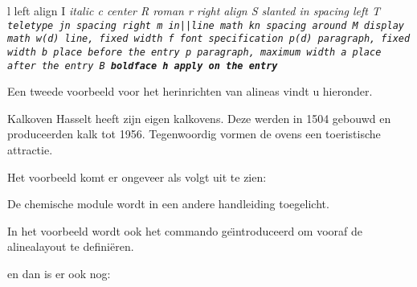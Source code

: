 \starttabel[|lT|l|lT|l|]
\NC l                 \NC left align
\NC I                 \NC \it italic
\NC \FR
\NC c                 \NC center
\NC R                 \NC \sl roman
\NC \MR
\NC r                 \NC right align
\NC S                 \NC \sl slanted
\NC \MR
\NC i\sl n            \NC spacing left
\NC T                 \NC \tt teletype
\NC \MR
\NC j\sl n            \NC spacing right
\NC m                 \NC in||line math
\NC \MR
\NC k\sl n            \NC spacing around
\NC M                 \NC display  math
\NC \MR
\NC w({\sl d})         line,   fixed width
\NC f    \NC font specification
\NC \MR
\NC p({\sl d})        \NC paragraph, fixed width
\NC b         \NC place  before the entry
\NC \MR
\NC p                 \NC paragraph, maximum width
\NC a         \NC place  after the entry
\NC \MR
\NC B                 \NC \bf boldface
\NC h    \NC apply  on the entry
\NC \LR
\stoptabel

Een tweede voorbeeld voor het herinrichten van
alineas vindt u hieronder.

\startbuffer
{}

\startChemPar
\NC Kalkoven
    \NC Hasselt heeft zijn eigen kalkovens. Deze werden in 1504
        gebouwd en produceerden kalk tot 1956. Tegenwoordig
        vormen de ovens een toeristische attractie.
    \NC {} \NC\NR
\stopChemPar
\stopbuffer

\typebuffer

Het voorbeeld komt er ongeveer als volgt uit te zien:

\haalbuffer

De chemische module wordt in een andere handleiding
toegelicht.

In het voorbeeld wordt ook het commando ge\"{\i}ntroduceerd
om vooraf de alinealayout te defini\"eren.


en dan is er ook nog:


\stoponderdeel
